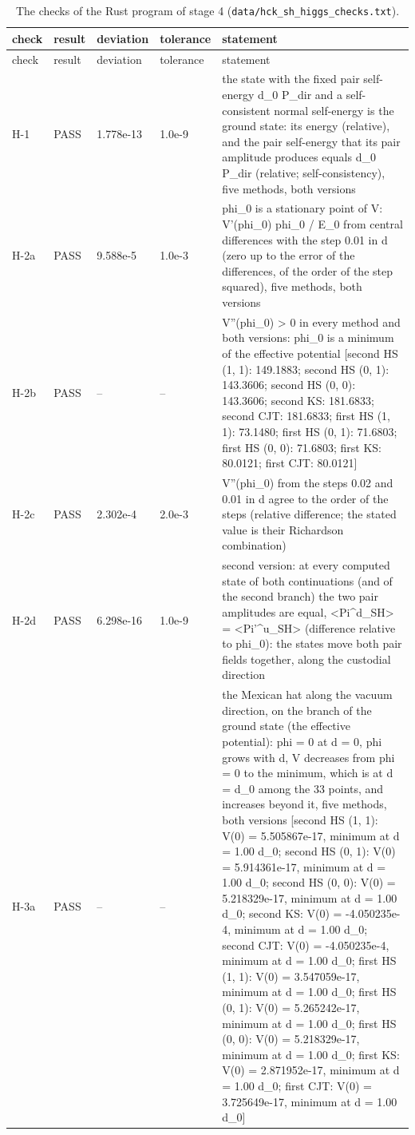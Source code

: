 \documentclass[aps,prd,onecolumn,superscriptaddress,nofootinbib,floatfix,longbibliography]{revtex4-2}
\begin{document}
\begingroup\fontsize{7}{8.5}\selectfont\setlength{\tabcolsep}{3pt}
\begin{longtable}{p{}p{}p{}p{}p{}}
\caption{\label{tab:checks_higgs_rust}The checks of the Rust program of stage 4 (\texttt{data/hck\_sh\_higgs\_checks.txt}).}\\
\hline\hline
check & result & deviation & tolerance & statement \\ \hline
\endfirsthead
\hline check & result & deviation & tolerance & statement \\ \hline
\endhead
\hline\hline
\endlastfoot
H-1 & PASS & 1.778e-13 & 1.0e-9 & the state with the fixed pair self-energy d\_0 P\_dir and a self-consistent normal self-energy is the ground state: its energy (relative), and the pair self-energy that its pair amplitude produces equals d\_0 P\_dir (relative; self-consistency), five methods, both versions \\
H-2a & PASS & 9.588e-5 & 1.0e-3 & phi\_0 is a stationary point of V: V'(phi\_0) phi\_0 / \textbar{}E\_0\textbar{} from central differences with the step 0.01 in d (zero up to the error of the differences, of the order of the step squared), five methods, both versions \\
H-2b & PASS & -- & -- & V''(phi\_0) \textgreater{} 0 in every method and both versions: phi\_0 is a minimum of the effective potential [second HS (1, 1): 149.1883; second HS (0, 1): 143.3606; second HS (0, 0): 143.3606; second KS: 181.6833; second CJT: 181.6833; first HS (1, 1): 73.1480; first HS (0, 1): 71.6803; first HS (0, 0): 71.6803; first KS: 80.0121; first CJT: 80.0121] \\
H-2c & PASS & 2.302e-4 & 2.0e-3 & V''(phi\_0) from the steps 0.02 and 0.01 in d agree to the order of the steps (relative difference; the stated value is their Richardson combination) \\
H-2d & PASS & 6.298e-16 & 1.0e-9 & second version: at every computed state of both continuations (and of the second branch) the two pair amplitudes are equal, \textbar{}\textless{}Pi\textasciicircum{}d\_SH\textgreater{}\textbar{} = \textbar{}\textless{}Pi'\textasciicircum{}u\_SH\textgreater{}\textbar{} (difference relative to phi\_0): the states move both pair fields together, along the custodial direction \\
H-3a & PASS & -- & -- & the Mexican hat along the vacuum direction, on the branch of the ground state (the effective potential): phi = 0 at d = 0, phi grows with d, V decreases from phi = 0 to the minimum, which is at d = d\_0 among the 33 points, and increases beyond it, five methods, both versions [second HS (1, 1): V(0) = 5.505867e-17, minimum at d = 1.00 d\_0; second HS (0, 1): V(0) = 5.914361e-17, minimum at d = 1.00 d\_0; second HS (0, 0): V(0) = 5.218329e-17, minimum at d = 1.00 d\_0; second KS: V(0) = -4.050235e-4, minimum at d = 1.00 d\_0; second CJT: V(0) = -4.050235e-4, minimum at d = 1.00 d\_0; first HS (1, 1): V(0) = 3.547059e-17, minimum at d = 1.00 d\_0; first HS (0, 1): V(0) = 5.265242e-17, minimum at d = 1.00 d\_0; first HS (0, 0): V(0) = 5.218329e-17, minimum at d = 1.00 d\_0; first KS: V(0) = 2.871952e-17, minimum at d = 1.00 d\_0; first CJT: V(0) = 3.725649e-17, minimum at d = 1.00 d\_0] \\

\end{longtable}
\end{document}
